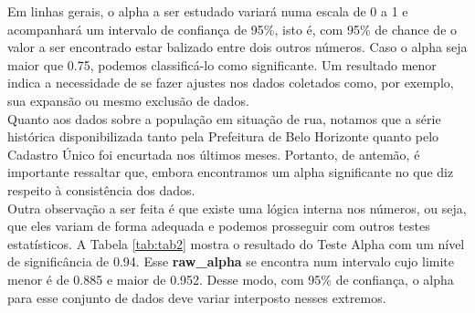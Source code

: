 \documentclass[12pt]{article}
\begin{document}
Em linhas gerais, o alpha a ser estudado variará numa escala de 0 a 1 e acompanhará um intervalo de confiança de 95\%, isto é, com 95\% de chance de o valor a ser encontrado estar balizado entre dois outros números. Caso o alpha seja maior que 0.75, podemos classificá-lo como significante. Um resultado menor indica a necessidade de se fazer ajustes nos dados coletados como, por exemplo, sua expansão ou mesmo exclusão de dados.\\

Quanto aos dados sobre a população em situação de rua, notamos que a série histórica disponibilizada tanto pela Prefeitura de Belo Horizonte quanto pelo Cadastro Único foi encurtada nos últimos meses. Portanto, de antemão, é importante ressaltar que, embora encontramos um alpha significante no que diz respeito à consistência dos dados.\\ 

Outra observação a ser feita  é que existe uma lógica interna nos números, ou seja, que eles variam de forma adequada e podemos prosseguir com outros testes estatísticos. A Tabela \ref{tab:tab2} mostra o resultado do Teste Alpha com um nível de significância de 0.94. Esse \textbf{raw\_alpha} se encontra num intervalo cujo limite menor é de 0.885 e maior de 0.952. Desse modo, com 95\% de confiança, o alpha para esse conjunto de dados deve variar interposto nesses extremos.\\
\end{document}
